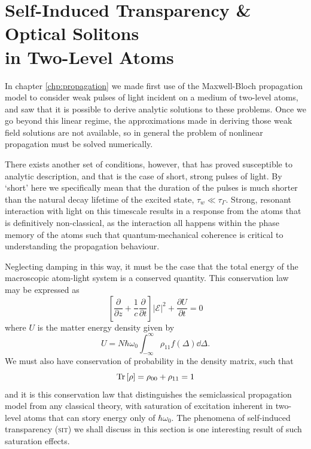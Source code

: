 \section[Self-Induced Transparency \& Optical Solitons]
  {Self-Induced Transparency \& Optical Solitons\\ in Two-Level Atoms}
  \label{sec:sit}


    In chapter \ref{chp:propagation} we made first use of the Maxwell-Bloch
    propagation model to consider weak pulses of light incident on a medium of
    two-level atoms, and saw that it is possible to derive analytic solutions to
    these problems. Once we go beyond this linear regime, the approximations
    made in deriving those weak field solutions are not available, so in general
    the problem of nonlinear propagation must be solved numerically.

    There exists another set of conditions, however, that has proved susceptible
    to analytic description, and that is the case of short, strong pulses of
    light. By `short' here we specifically mean that the duration of the pulses
    is much shorter than the natural decay lifetime of the excited state, \ie
    $\tau_w \ll \tau_\Gamma$. Strong, resonant interaction with light on this
    timescale results in a response from the atoms that is definitively 
    non-classical, as the interaction all happens within the phase memory of the
    atoms such that quantum-mechanical coherence is critical to understanding
    the propagation behaviour.

    Neglecting damping in this way, it must be the case that the total energy of
    the macroscopic atom-light system is a conserved quantity. This conservation
    law may be expressed as\cite{allen1975optical}
    \begin{equation}
      \left[ \frac{\partial}{\partial z} + 
      \frac{1}{c}\frac{\partial}{\partial t} \right]
      \lvert \mathcal{E} \rvert^2 + \frac{\partial U}{\partial t} = 0
    \end{equation}
    where $U$ is the matter energy density given by
    \begin{equation}
      U = N \hbar \omega_0 \int_{-\infty}^{\infty} \rho_{11} f(\Delta)  
      \dd \Delta.
    \end{equation}
    We must also have conservation of probability in the density matrix,
    such that
    \begin{equation}
      \operatorname{Tr}{\left[ \rho \right]} = \rho_{00} + \rho_{11} = 1  
    \end{equation}
    and it is this conservation law that distinguishes the semiclassical
    propagation model from any classical theory, with saturation of excitation
    inherent in two-level atoms that can story energy only of $\hbar \omega_0$.
    The phenomena of self-induced transparency (\textsc{sit}) we shall discuss
    in this section is one interesting result of such saturation effects.

